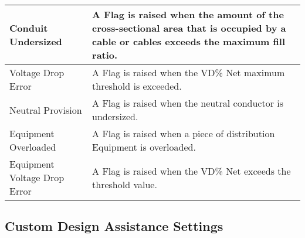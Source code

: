 \documentclass[letterpaper,10pt,english]{sphinxmanual}
\begin{document}
\begin{savenotes}
\begin{tabulary}{\linewidth}[t]{|T|T|}
\\
\hline
Conduit Undersized
&
A Flag is raised when the amount of the cross-sectional area that is occupied by a cable or cables exceeds the maximum fill ratio.
\\
\hline
Voltage Drop Error
&
A Flag is raised when the VD\% Net maximum threshold is exceeded.
\\
\hline
Neutral Provision
&
A Flag is raised when the neutral conductor is undersized.
\\
\hline
Equipment Overloaded
&
A Flag is raised when a piece of distribution Equipment is overloaded.
\\
\hline
Equipment Voltage Drop Error
&
A Flag is raised when the VD\% Net exceeds the threshold value.
\\
\hline
\end{tabulary}
\par
\sphinxattableend\end{savenotes}


\subsection{Custom Design Assistance Settings}
\label{\detokenize{docs/definitions/index-definitions:custom-design-assistance-settings}}\label{\detokenize{docs/definitions/index-definitions:custom-design-assistance-settings-definitions}}
\end{document}
